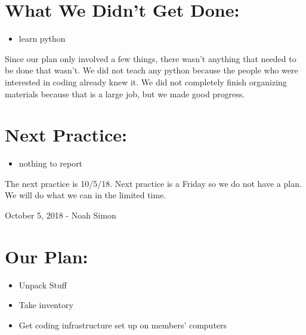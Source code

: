 \documentclass[12pt]{article}
\begin{document}
\section{What We Didn't Get Done:} %
\begin{itemize}
	\item learn python
\end{itemize}

Since our plan only involved a few things, there wasn’t anything that needed to be done that wasn’t. We did not teach any python because the people who were interested in coding already knew it. We did not completely finish organizing materials because that is a large job, but we made good progress. 

\section{Next Practice:}
\begin{itemize}
	\item nothing to report
\end{itemize}

The next practice is 10/5/18. Next practice is a Friday so we do not have a plan. We will do what we can in the limited time.

\newpage
\setcounter{section}{0}

October 5, 2018 - Noah Simon

\section{Our Plan:} %
\begin{itemize}
	\item Unpack Stuff
	\item Take inventory
	\item Get coding infrastructure set up on members' computers
\end{itemize}
\end{document}
